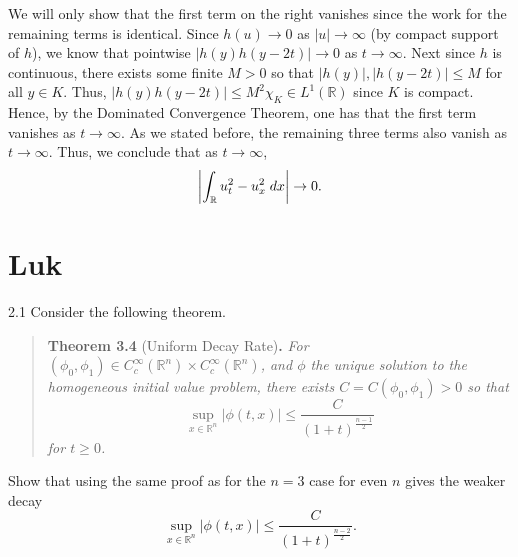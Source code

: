 \documentclass{article}
\begin{document}
\begin{enumerate}[itemsep =-2pt,label = (\alph{*})]
\begin{enumerate}[itemsep =-2pt,label = (\roman{*})]
	We will only show that the first term on the right vanishes since the work for the remaining terms is identical. Since $h(u) \to 0$ as $|u| \to \infty$ (by compact support of $h$), we know that pointwise $|h(y)h(y - 2t)| \to 0$ as $t \to \infty$. Next since $h$ is continuous, there exists some finite $M > 0$ so that $|h(y)|, |h(y - 2t)| \leq M$ for all $y \in K$. Thus, $|h(y)h(y-2t)| \leq M^2\chi_{K} \in L^1(\mathbb{R})$ since $K$ is compact. Hence, by the Dominated Convergence Theorem, one has that the first term vanishes as $t \to \infty$. As we stated before, the remaining three terms also vanish as $t \to \infty$. Thus, we conclude that as $t \to \infty$,
	\begin{equation*}
		\left| \int_{\mathbb{R}}u_t^2 - u_x^2\;dx \right| \to 0. 
	\end{equation*}
\end{enumerate}
\end{enumerate}

\section{Luk}

\begin{prb}{2.1}
	Consider the following theorem. 
	\begin{quote}
		\textbf{Theorem 3.4} (Uniform Decay Rate)\textbf{.} \textit{For $(\phi_0, \phi_1) \in C_c^{\infty}(\mathbb{R}^n) \times C_c^{\infty}(\mathbb{R}^n)$, and $\phi$ the unique solution to the homogeneous initial value problem, there exists $C = C(\phi_0, \phi_1) > 0$ so that}
		\begin{equation*}
			\sup_{x \in \mathbb{R}^n}|\phi(t,x)| \leq \frac{C}{(1 + t)^{\frac{n-1}{2}}}
		\end{equation*}
		\textit{for $t\geq 0$.}
	\end{quote}
	Show that using the same proof as for the $n = 3$ case for even $n$ gives the weaker decay 
	\begin{equation*}
		\sup_{x \in \mathbb{R}^{n}}|\phi(t, x)| \leq \frac{C}{(1 + t)^{\frac{n-2}{2}}}. 
	\end{equation*} 
\end{prb}
\end{document}
